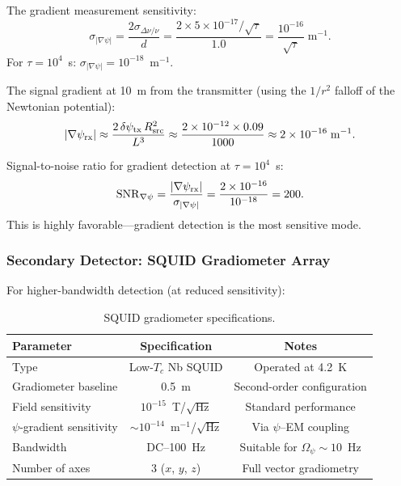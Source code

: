 \documentclass[11pt,onecolumn]{article}
\begin{document}
The gradient measurement sensitivity:
\begin{equation}
\sigma_{|\nabla\psi|} = \frac{2\sigma_{\Delta\nu/\nu}}{d}
= \frac{2 \times 5 \times 10^{-17}/\sqrt{\tau}}{1.0}
= \frac{10^{-16}}{\sqrt{\tau}}\;\text{m}^{-1}.
\end{equation}
For $\tau = 10^4$~s: $\sigma_{|\nabla\psi|} = 10^{-18}$~m$^{-1}$.

The signal gradient at 10~m from the transmitter (using the $1/r^2$
falloff of the Newtonian potential):
\begin{equation}
|\nabla\psi_{\rm rx}| \approx \frac{2\,\delta\psi_{\rm tx}\,R_{\rm src}^2}{L^3}
\approx \frac{2 \times 10^{-12} \times 0.09}{1000}
\approx 2 \times 10^{-16}\;\text{m}^{-1}.
\end{equation}

Signal-to-noise ratio for gradient detection at $\tau = 10^4$~s:
\begin{equation}
\mathrm{SNR}_{\nabla\psi} = \frac{|\nabla\psi_{\rm rx}|}{\sigma_{|\nabla\psi|}}
= \frac{2 \times 10^{-16}}{10^{-18}} = 200.
\end{equation}
This is highly favorable---gradient detection is the most sensitive mode.

\subsubsection{Secondary Detector: SQUID Gradiometer Array}

For higher-bandwidth detection (at reduced sensitivity):

\begin{table}[H]
\centering
\caption{SQUID gradiometer specifications.}
\label{tab:squid-specs}
\begin{tabular}{lcc}
\toprule
Parameter & Specification & Notes \\
\midrule
Type & Low-$T_c$ Nb SQUID & Operated at 4.2~K \\
Gradiometer baseline & 0.5~m & Second-order configuration \\
Field sensitivity & $10^{-15}$~T/$\sqrt{\text{Hz}}$ & Standard performance \\
$\psi$-gradient sensitivity & $\sim 10^{-14}$~m$^{-1}$/$\sqrt{\text{Hz}}$ & Via $\psi$--EM coupling \\
Bandwidth & DC--100~Hz & Suitable for $\Omega_\psi \sim 10$~Hz \\
Number of axes & 3 ($x$, $y$, $z$) & Full vector gradiometry \\
\bottomrule
\end{tabular}
\end{table}
\end{document}
